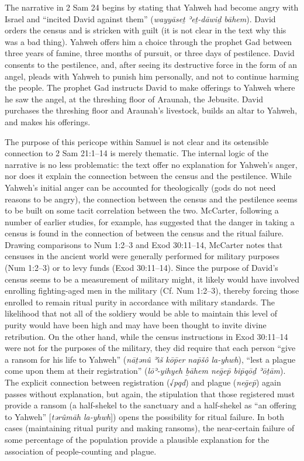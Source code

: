 The narrative in 2 Sam 24 begins by stating that Yahweh had become angry
with Israel and ``incited David against them'' (\emph{wayyāseṯ ʾeṯ-dāwiḏ
bāhem}). David orders the census and is stricken with guilt (it is not
clear in the text why this was a bad thing). Yahweh offers him a choice
through the prophet Gad between three years of famine, three months of
pursuit, or three days of pestilence. David consents to the pestilence,
and, after seeing its destructive force in the form of an angel, pleads
with Yahweh to punish him personally, and not to continue harming the
people. The prophet Gad instructs David to make offerings to Yahweh
where he saw the angel, at the threshing floor of Araunah, the Jebusite.
David purchases the threshing floor and Araunah's livestock, builds an
altar to Yahweh, and makes his offerings.

The purpose of this pericope within Samuel is not clear and its
ostensible connection to 2 Sam 21:1--14 is merely
thematic.\autocite[509]{mccarter1984} The internal logic of the
narrative is no less problematic: the text offer no explanation for
Yahweh's anger, nor does it explain the connection between the census
and the pestilence. While Yahweh's initial anger can be accounted for
theologically (gods do not need reasons to be angry), the connection
between the census and the pestilence seems to be built on some tacit
correlation between the two. McCarter, following a number of earlier
studies, for example, has suggested that the danger in taking a census
is found in the connection of between the census and the ritual failure.
Drawing comparisons to Num 1:2--3 and Exod 30:11--14, McCarter notes
that censuses in the ancient world were generally performed for military
purposes (Num 1:2--3) or to levy funds (Exod 30:11--14). Since the
purpose of David's census seems to be a measurement of military might,
it likely would have involved enrolling fighting-aged men in the
military (Cf. Num 1:2--3), thereby forcing those enrolled to remain
ritual purity in accordance with military standards. The likelihood that
not all of the soldiery would be able to maintain this level of purity
would have been high and may have been thought to invite divine
retribution. On the other hand, while the census instructions in Exod
30:11--14 were not for the purposes of the military, they did require
that each person ``give a ransom for his life to Yahweh'' (\emph{nāṯənû
ʾı̂š kōp̄er nap̄šô la-yhwh}), ``lest a plague come upon them at their
registration'' (\emph{lōʾ-yihyeh ḇāhem neḡep̄ bip̄qōḏ ʾōṯām}). The
explicit connection between registration (√\emph{pqd}) and plague
(\emph{neḡep̄}) again passes without explanation, but again, the
stipulation that those registered must provide a ransom (a half-shekel
to the sanctuary and a half-shekel as ``an offering to Yahweh''
{[}\emph{tərûmāh la-yhwh}{]}) opens the possibility for ritual failure.
In both cases (maintaining ritual purity and making ransoms), the
near-certain failure of some percentage of the population provide a
plausible explanation for the association of people-counting and plague.

